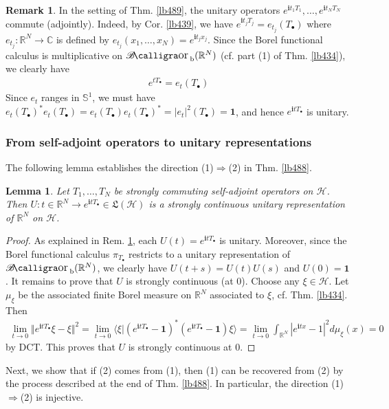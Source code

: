 \documentclass[12pt,b5paper,notitlepage]{article}
\theoremstyle{definition}
\newtheorem{rem}[df]{Remark}
\theoremstyle{plain}
\newtheorem{lm}[df]{Lemma}
\DeclareMathOperator{\Borb}{{\mathscr{B}\text{\kern -2pt {\calligra\large or}}\,}_{\mathrm b}}
\newcommand{\fk}{\mathfrak}
\newcommand{\idt}{\mathbf{1}}
\newcommand{\bk}[1]{\langle {#1}\rangle}
\newcommand{\im}{\mathbf{i}}
\newcommand{\blt}{\bullet}
\newcommand{\Cbb}{\mathbb C}
\newcommand{\Rbb}{\mathbb R}
\newcommand{\Sbb}{{\mathbb S}}
\newcommand{\MH}{\mathcal H}
\numberwithin{equation}{section}
\begin{document}
\begin{rem}\label{lb490}
In the setting of Thm. \ref{lb489}, the unitary operators $e^{\im t_1T_1},\dots,e^{\im t_NT_N}$ commute (adjointly). Indeed, by Cor. \ref{lb439}, we have $e^{\im t_jT_j}=e_{t_j}(T_\blt)$ where $e_{t_j}:\Rbb^N\rightarrow \Cbb$ is defined by $e_{t_j}(x_1,\dots,x_N)=e^{\im t_jx_j}$. Since the Borel functional calculus is multiplicative on $\Borb(\Rbb^N)$ (cf. part (1) of Thm. \ref{lb434}), we clearly have
\begin{align*}
e^{tT_\blt}=e_t(T_\blt)
\end{align*}
Since $e_t$ ranges in $\Sbb^1$, we must have $e_t(T_\blt)^*e_t(T_\blt)=e_t(T_\blt)e_t(T_\blt)^*=|e_t|^2(T_\blt)=\idt$, and hence $e^{\im tT_\blt}$ is unitary.
\end{rem}


\subsubsection{From self-adjoint operators to unitary representations}



The following lemma establishes the direction (1)$\Rightarrow$(2) in Thm. \ref{lb488}.


\begin{lm}
Let $T_1,\dots,T_N$ be strongly commuting self-adjoint operators on $\MH$. Then $U:t\in\Rbb^N\rightarrow e^{\im tT_\blt}\in\fk L(\MH)$ is a strongly continuous unitary representation of $\Rbb^N$ on $\MH$.
\end{lm}

\begin{proof}
As explained in Rem. \ref{lb490}, each $U(t)=e^{\im tT_\blt}$ is unitary. Moreover, since the Borel functional calculus $\pi_{T_\blt}$ restricts to a unitary representation of $\Borb(\Rbb^N)$, we clearly have $U(t+s)=U(t)U(s)$ and $U(0)=\idt$. It remains to prove that $U$ is strongly continuous (at $0$). Choose any $\xi\in\MH$. Let $\mu_\xi$ be the associated finite Borel measure on $\Rbb^N$ associated to $\xi$, cf. Thm. \ref{lb434}. Then
\begin{align*}
\lim_{t\rightarrow0}\Vert e^{\im tT_\blt}\xi-\xi\Vert^2=\lim_{t\rightarrow0}\bk{\xi|(e^{\im tT_\blt}-\idt)^*(e^{\im tT_\blt}-\idt)\xi}=\lim_{t\rightarrow0}\int_{\Rbb^N}|e^{\im tx}-1|^2d\mu_\xi(x)=0
\end{align*}
by DCT. This proves that $U$ is strongly continuous at $0$.
\end{proof}

Next, we show that if (2) comes from (1), then (1) can be recovered from (2) by the process described at the end of Thm. \ref{lb488}. In particular, the direction (1)$\Rightarrow$(2) is injective.
\end{document}
